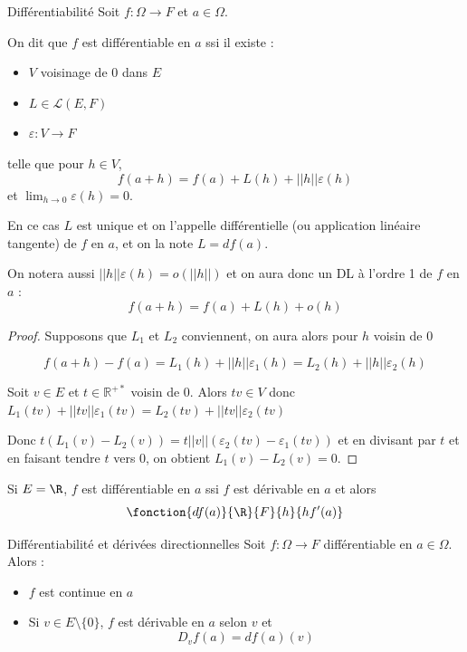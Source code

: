 \begin{theoreme}{Différentiabilité}{}
    Soit $f : \Omega \to F$ et $a \in \Omega$. 

    On dit que $f$ est différentiable en $a$ ssi il existe : 
    \begin{itemize}
        \item $V$ voisinage de $0$ dans $E$
        \item $L \in \mathscr L(E, F)$
        \item $\varepsilon : V \to F$
    \end{itemize}

    telle que pour $h \in V$, 
    $$f(a + h) = f(a) + L(h) + ||h||\varepsilon(h)$$
    et $\displaystyle \lim_{h \to 0} \varepsilon(h) = 0$.

    En ce cas $L$ est unique et on l'appelle différentielle (ou application linéaire 
    tangente) de $f$ en $a$, et on  la note $L = df(a)$.

    On notera aussi $||h|| \varepsilon(h) = o(||h||)$ et on aura donc un DL 
    à l'ordre 1 de $f$ en $a$ :
    $$f(a + h) = f(a) + L(h) + o(h)$$
\end{theoreme}

\begin{proof}
    Supposons que $L_1$ et $L_2$ conviennent, on aura alors pour $h$ voisin de $0$ 
    
    $$f(a + h) - f(a) = L_1(h) + ||h|| \varepsilon_1(h) = L_2(h) + ||h|| \varepsilon_2(h)$$

    Soit $v \in E$ et $t \in \mathbb R^{+*}$ voisin de $0$. Alors 
    $tv \in V$ donc $L_1(tv) + ||tv|| \varepsilon_1(tv) = L_2(tv) + ||tv|| \varepsilon_2(tv)$

    Donc $t (L_1(v) - L_2(v)) = t ||v|| (\varepsilon_2(tv) - \varepsilon_1(tv))$
    et en divisant par $t$ et en faisant tendre $t$ vers $0$, on obtient $L_1(v) - L_2(v) = 0$.
\end{proof}

\begin{remarque}
    Si $E = \R$, $f$ est différentiable en $a$ ssi $f$ est dérivable en $a$ et alors 
    $$\fonction{df(a)}{\R}{F}{h}{h f'(a)}$$
\end{remarque}

\begin{proposition}{Différentiabilité et dérivées directionnelles}{}
    Soit $f : \Omega \to F$ différentiable en $a \in \Omega$. Alors : 
    \begin{itemize}
        \item $f$ est continue en $a$
        \item Si $v \in E \setminus \{0\}$, $f$ est dérivable en $a$ selon $v$ et 
        $$D_v f(a) = df(a)(v)$$
    \end{itemize}
\end{proposition}

